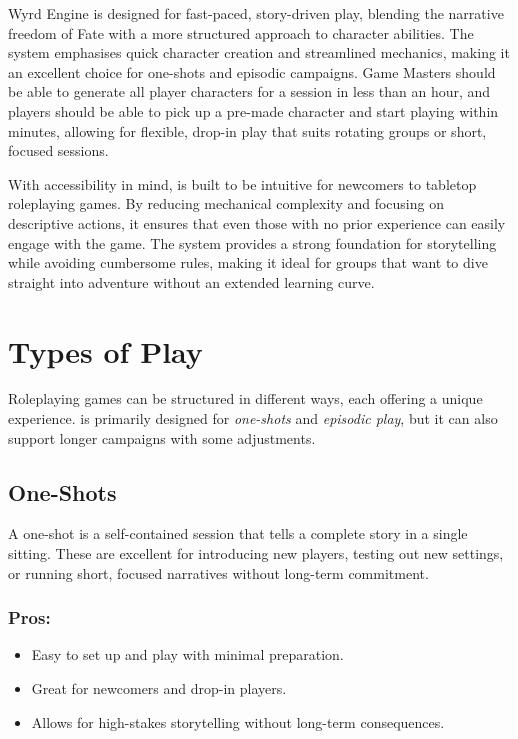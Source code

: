 

 Wyrd Engine is designed for fast-paced, story-driven play, blending the narrative freedom of Fate with a more structured approach to character abilities. The system emphasises quick character creation and streamlined mechanics, making it an excellent choice for one-shots and episodic campaigns. Game Masters should be able to generate all player characters for a session in less than an hour, and players should be able to pick up a pre-made character and start playing within minutes, allowing for flexible, drop-in play that suits rotating groups or short, focused sessions.

With accessibility in mind, \wyrd is built to be intuitive for newcomers to tabletop roleplaying games. By reducing mechanical complexity and focusing on descriptive actions, it ensures that even those with no prior experience can easily engage with the game. The system provides a strong foundation for storytelling while avoiding cumbersome rules, making it ideal for groups that want to dive straight into adventure without an extended learning curve.


\section{Types of Play}

Roleplaying games can be structured in different ways, each offering a unique experience. \wyrd is primarily designed for \emph{one-shots} and \emph{episodic play}, but it can also support longer campaigns with some adjustments.

\subsection{One-Shots}
A one-shot is a self-contained session that tells a complete story in a single sitting. These are excellent for introducing new players, testing out new settings, or running short, focused narratives without long-term commitment.

\subsubsection{Pros:}
\begin{itemize}
    \item Easy to set up and play with minimal preparation.
    \item Great for newcomers and drop-in players.
    \item Allows for high-stakes storytelling without long-term consequences.
\end{itemize}

